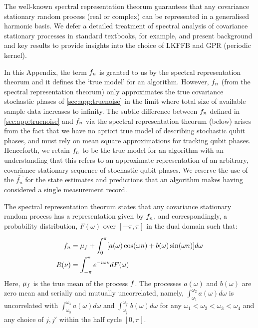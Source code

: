  The well-known spectral representation theorum  guarantees that any covariance stationary random process (real or complex) can be represented in a generalised harmonic basis.  We defer a detailed treatment of spectral analysis of covariance stationary processes in standard textbooks, for example, \cite{hamilton1994time,karlin1975first} and present background and key results to provide insights into the choice of LKFFB and GPR (periodic kernel).

In this Appendix, the term $f_n $ is granted to us by the spectral representation theorum and it defines the `true model' for an algorithm. However, $f_n $ (from the spectral representation theorum) only approximates the true covariance stochastic phases of \cref{sec:app:truenoise} in the limit where total size of available sample data increases to infinity. The subtle difference between $f_n$ defined in \cref{sec:app:truenoise} and $f_n $ via the spectral representation theorum (below) arises from the fact that we have no apriori true model of describing stochastic qubit phases, and must rely on mean square approximations for tracking qubit phases. Henceforth, we retain $f_n $ to be the true model for an algorithm with an understanding that this refers to an approximate representation of an arbitrary, covariance stationary sequence of stochastic qubit phases. We reserve the use of the $\hat{f_n}$ for the state estimates and predictions that an algorithm makes having considered a single measurement record. 

 The spectral representation theorum states that any covariance stationary random process has a representation given by $f_n$, and correspondingly,  a probability distribution, $F(\omega)$ over $[-\pi, \pi]$ in the dual domain such that:
 
\begin{align}
f_n & = \mu_f + \int_{0}^{\pi} [ a(\omega) \cos(\omega n) +  b(\omega) \sin(\omega n) ] d\omega \\
R(\nu) & = \int_{-\pi}^{\pi} e^{-i\omega \nu } dF(\omega)
\end{align}
Here, $\mu_f $ is the true mean of the process $f$.  The processes $a(\omega) $ and $b(\omega)$ are zero mean and serially and mutually uncorrelated, namely, $\int_{\omega_1}^{\omega_{2}} a(\omega) d\omega$ is uncorrelated with $\int_{\omega_3}^{\omega_{4}} a(\omega) d\omega$ and $\int_{\omega_j}^{\omega_{j'}} b(\omega) d\omega$ for any $\omega_1 < \omega_2 < \omega_3 < \omega_4$ and any choice of $j, j'$ within the half cycle  $[0, \pi]$.

